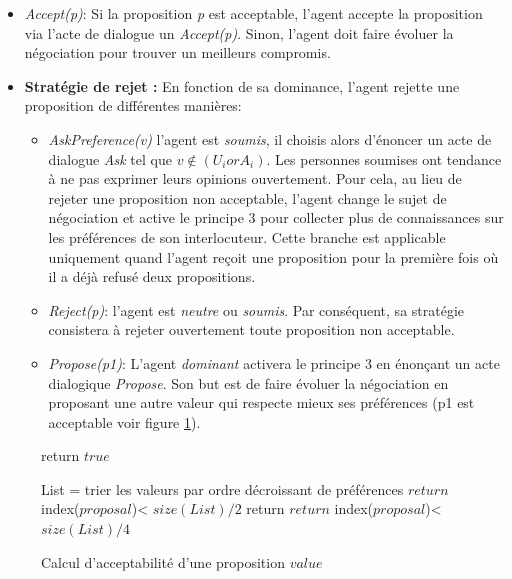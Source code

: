 	\begin{itemize}	
		\item  \emph{Accept(p)}: Si la proposition \emph{p} est acceptable, l'agent accepte la proposition via l'acte de dialogue un \emph{Accept(p)}. Sinon, l'agent doit faire évoluer la négociation pour trouver un meilleurs compromis. 
		\item \textbf{Stratégie de rejet :} En fonction de sa dominance, l'agent rejette une proposition de différentes manières:
		\begin{itemize}[label= $\circ$]
			\item \emph{AskPreference(v)} l'agent est \emph{soumis}, il choisis alors d'énoncer un acte de dialogue \emph{Ask} tel que $v \not\in (U_i or A_i)$. Les personnes soumises ont tendance à ne pas exprimer leurs opinions ouvertement. Pour cela, au lieu de rejeter une proposition non acceptable, l'agent change le sujet de négociation et active le principe 3 pour collecter plus de connaissances sur les préférences de son interlocuteur. Cette branche est applicable uniquement quand l'agent reçoit une proposition pour la première fois où il a déjà refusé deux propositions.  
			
			\item \emph{Reject(p)}: l'agent est \emph{neutre} ou \emph{soumis}. Par conséquent, sa stratégie consistera à rejeter ouvertement toute proposition non acceptable.
			
			\item \emph{Propose(p1)}: L'agent \emph{dominant} activera le principe 3 en énonçant un acte dialogique \emph{Propose}. Son but est de faire évoluer la négociation en proposant une autre valeur qui respecte mieux ses préférences (p1 est acceptable voir figure \ref{alg:pseudo}). 
		
		\end{itemize}
	\end{itemize}
	\begin{figure}[]
		\caption{\label{alg:pseudo} Calcul d'acceptabilité d'une proposition $value$}
		\begin{algorithmic}[1]
			\State return $true$
			\EndIf
			
			\State List = trier les valeurs par ordre décroissant de préférences
			\State $return$ index($proposal$)< $size(List)/2$
			\EndIf
			\State return $return$ index($proposal$)< $size(List)/4$
			\EndIf
			\EndFunction
		\end{algorithmic}
	\end{figure}
	
